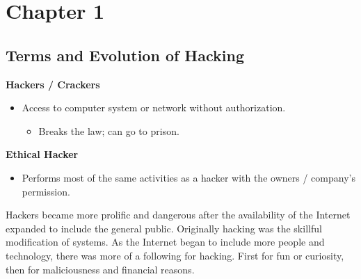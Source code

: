 \section{Chapter 1}
\subsection{Terms and Evolution of Hacking}
\textbf{Hackers / Crackers}
\begin{itemize}
    \item Access to computer system or network without authorization.
    \begin{itemize}
        \item Breaks the law; can go to prison.
    \end{itemize}
\end{itemize}

\textbf{Ethical Hacker}
\begin{itemize}
    \item Performs most of the same activities as a hacker with the owners / company's permission.
\end{itemize}

Hackers became more prolific and dangerous after the availability of the Internet expanded to include the general public.
Originally hacking was the skillful modification of systems.
As the Internet began to include more people and technology, there was more of a following for hacking.
First for fun or curiosity, then for maliciousness and financial reasons.

